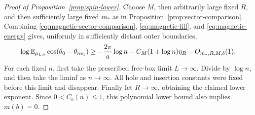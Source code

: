 \begin{proof}[Proof of Proposition~\ref{prop:spin-lower}]
Choose \(M\), then arbitrarily large fixed \(R\), and then
sufficiently large fixed \(m_*\) as in
Proposition~\ref{prop:sector-comparison}. Combining
\eqref{eq:magnetic-sector-comparison},
\eqref{eq:magnetic-fill}, and \eqref{eq:magnetic-energy}
gives, uniformly in sufficiently distant outer boundaries,
\[
 \log \mathbb E_{\mu_{L,b}}\cos(\theta_0-\theta_{ne_1})
 \ge -\frac{2\pi}{a}\log n
       -C_M(1+\log n)\eta_R-O_{m_*,R,M,b}(1).
\]
For each fixed \(n\), first take the prescribed free-box
limit \(L\to\infty\). Divide by \(\log n\), and then
take the liminf as \(n\to\infty\). All hole and insertion
constants were fixed before this limit and disappear.
Finally let \(R\to\infty\), obtaining the claimed lower
exponent. Since \(0<C_b(n)\le1\), this polynomial lower
bound also implies \(m(b)=0\).
\end{proof}
